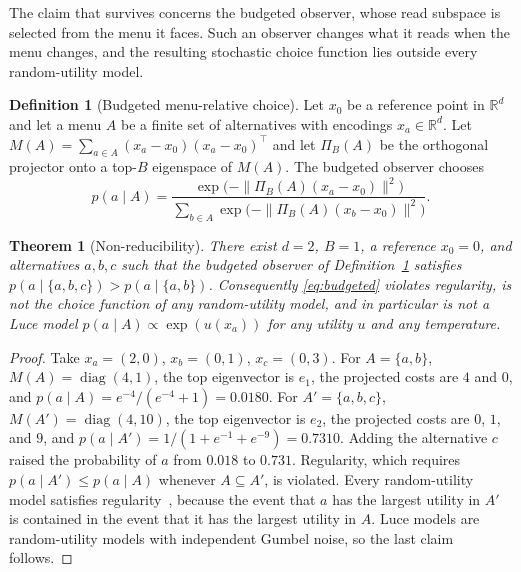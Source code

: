\documentclass[11pt]{article}
\newtheorem{theorem}{Theorem}
\theoremstyle{definition}
\newtheorem{definition}{Definition}
\theoremstyle{remark}
\newcommand{\R}{\mathbb{R}}
\begin{document}
The claim that survives concerns the budgeted observer, whose read subspace is selected from the menu it faces.
Such an observer changes what it reads when the menu changes, and the resulting stochastic choice function lies outside every random-utility model.

\begin{definition}[Budgeted menu-relative choice]
\label{def:budgeted}
Let $x_{0}$ be a reference point in $\R^{d}$ and let a menu $A$ be a finite set of alternatives with encodings $x_{a}\in\R^{d}$. Let $M(A)=\sum_{a\in A}(x_{a}-x_{0})(x_{a}-x_{0})^{\top}$ and let $\Pi_{B}(A)$ be the orthogonal projector onto a top-$B$ eigenspace of $M(A)$. The budgeted observer chooses
\begin{equation}
p(a\mid A)=\frac{\exp\bigl(-\|\Pi_{B}(A)(x_{a}-x_{0})\|^{2}\bigr)}{\sum_{b\in A}\exp\bigl(-\|\Pi_{B}(A)(x_{b}-x_{0})\|^{2}\bigr)}.
\label{eq:budgeted}
\end{equation}
\end{definition}

\begin{theorem}[Non-reducibility]
\label{thm:nonred}
There exist $d=2$, $B=1$, a reference $x_{0}=0$, and alternatives $a,b,c$ such that the budgeted observer of Definition~\ref{def:budgeted} satisfies $p(a\mid\{a,b,c\})>p(a\mid\{a,b\})$. Consequently \eqref{eq:budgeted} violates regularity, is not the choice function of any random-utility model, and in particular is not a Luce model $p(a\mid A)\propto\exp(u(x_{a}))$ for any utility $u$ and any temperature.
\end{theorem}

\begin{proof}
Take $x_{a}=(2,0)$, $x_{b}=(0,1)$, $x_{c}=(0,3)$.
For $A=\{a,b\}$, $M(A)=\operatorname{diag}(4,1)$, the top eigenvector is $e_{1}$, the projected costs are $4$ and $0$, and $p(a\mid A)=e^{-4}/(e^{-4}+1)=0.0180$.
For $A'=\{a,b,c\}$, $M(A')=\operatorname{diag}(4,10)$, the top eigenvector is $e_{2}$, the projected costs are $0$, $1$, and $9$, and $p(a\mid A')=1/(1+e^{-1}+e^{-9})=0.7310$.
Adding the alternative $c$ raised the probability of $a$ from $0.018$ to $0.731$.
Regularity, which requires $p(a\mid A')\le p(a\mid A)$ whenever $A\subseteq A'$, is violated.
Every random-utility model satisfies regularity~\cite{block1960,falmagne1978}, because the event that $a$ has the largest utility in $A'$ is contained in the event that it has the largest utility in $A$.
Luce models are random-utility models with independent Gumbel noise, so the last claim follows.
\end{proof}
\end{document}
